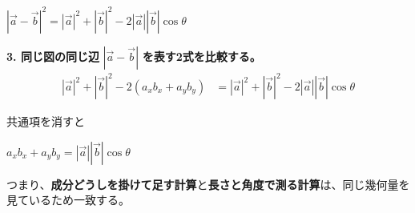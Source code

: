 \documentclass[paper=a4,fleqn,11pt]{jlreq}
\newcommand{\formula}[1]{%
  \vspace{10pt}%
  \begin{center}{\large\bfseries\boldmath\(\displaystyle #1\)}\end{center}%
  \vspace{4pt}%
}
\begin{document}
\begin{center}
\(|\vec{a}-\vec{b}|^2=|\vec{a}|^2+|\vec{b}|^2-2|\vec{a}||\vec{b}|\cos\theta\)
\end{center}

\textbf{3. 同じ図の同じ辺} $|\vec{a}-\vec{b}|$ \textbf{を表す2式を比較する。}
\begin{align*}
|\vec{a}|^2+|\vec{b}|^2-2(a_xb_x+a_yb_y)
&=|\vec{a}|^2+|\vec{b}|^2-2|\vec{a}||\vec{b}|\cos\theta
\end{align*}

共通項を消すと
\formula{a_xb_x+a_yb_y=|\vec{a}||\vec{b}|\cos\theta}

つまり、\textbf{成分どうしを掛けて足す計算}と\textbf{長さと角度で測る計算}は、同じ幾何量を見ているため一致する。
\end{document}
